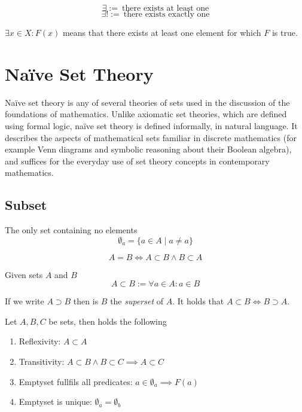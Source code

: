 \begin{definition}
   \[\exists :=~\text{there exists at least one}\]
   \[\exists! :=~\text{there exists exactly one}\]
\end{definition}
\begin{example}
   \(\exists x \in X: F(x)\) means that there exists at least one element for which \(F\) is true.
\end{example}

\section{Na\"ive Set Theory}
Na\"ive set theory is any of several theories of sets used in the discussion of the foundations of mathematics.
Unlike axiomatic set theories, which are defined using formal logic, na\"ive set theory is defined informally, in natural language.
It describes the aspects of mathematical sets familiar in discrete mathematics (for example Venn diagrams and symbolic reasoning about their Boolean algebra), and suffices for the everyday use of set theory concepts in contemporary mathematics.

\subsection{Subset}
\begin{definition}[Emptyset]\label{def:emptyset}
   The only set containing no elements
   \[\emptyset_a = \{a \in A \mid a \neq a\}\]
\end{definition}

\begin{definition}
   \[A = B \iff A \subset B \land B \subset A\]
\end{definition}

\begin{definition}[Subset]
   Given sets \(A\) and \(B\)
   \[A \subset B := \forall a \in A: a \in B\]
\end{definition}
\begin{remark}
   If we write \(A \supset B\) then is \(B\) the \emph{superset} of \(A\).
   It holds that \(A \subset B \iff B \supset A\).
\end{remark}

\begin{proposition}
   Let \(A, B, C\) be sets, then holds the following
   \begin{enumerate}[label=\roman*, align=Center]
      \item Reflexivity: \(A \subset A\)
      \item Transitivity: \(A \subset B \land B \subset C \implies A \subset C\)
      \item Emptyset fullfils all predicates: \(a \in \emptyset_a \implies F(a)\)
      \item Emptyset is unique: \(\emptyset_a = \emptyset_b\)
   \end{enumerate}
\end{proposition}

